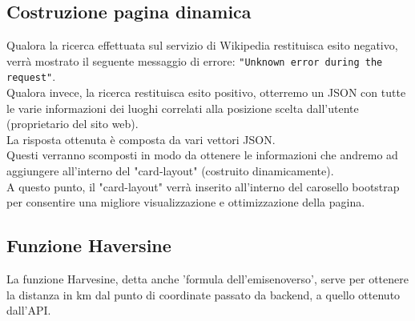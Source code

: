 \subsection*{Costruzione pagina dinamica} 
Qualora la ricerca effettuata sul servizio di Wikipedia restituisca esito negativo, verrà mostrato il seguente messaggio di errore: \texttt{"Unknown error during the request"}.\\
Qualora invece, la ricerca restituisca esito positivo, otterremo un JSON con tutte le varie informazioni dei luoghi correlati alla posizione scelta dall'utente (proprietario del sito web).\\
La risposta ottenuta è composta da vari vettori JSON.\\
Questi verranno scomposti in modo da ottenere le informazioni che andremo ad aggiungere all'interno del "card-layout" (costruito dinamicamente).\\
A questo punto, il "card-layout" verrà inserito all'interno del carosello bootstrap per consentire una migliore visualizzazione e ottimizzazione della pagina.\\
\subsection*{Funzione Haversine}
La funzione Harvesine, detta anche 'formula dell'emisenoverso', serve per ottenere la distanza in km dal punto di coordinate passato da backend, a quello ottenuto dall'API.